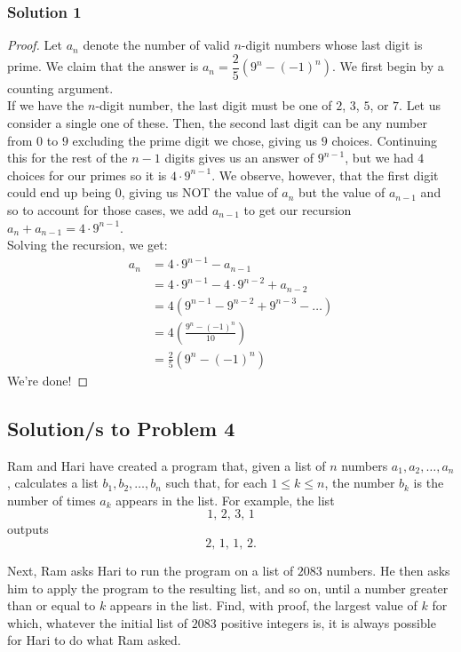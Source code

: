 \documentclass[11pt]{scrartcl}
\begin{document}
\subsubsection{Solution 1}

\begin{proof}
    Let $a_n$ denote the number of valid $n$-digit numbers whose last digit
    is prime. We claim that the answer is $a_n = \dfrac 25 (9^n-(-1)^n)$.
    We first begin by a counting argument. \\

    If we have the $n$-digit number, the last digit must be one of $2$, 
    $3$, $5$, or $7$. Let us consider a single one of these. Then, the 
    second last digit can be any number from $0$ to $9$ excluding the 
    prime digit we chose, giving us $9$ choices. Continuing this for the
    rest of the $n-1$ digits gives us an answer of $9^{n-1}$, but we had 
    $4$ choices for our primes so it is $4 \cdot 9^{n-1}$. We observe, however, 
    that the first digit could end up being $0$, giving us NOT the value of $a_n$
    but the value of $a_{n-1}$ and so to account for those cases, we add $a_{n-1}$ 
    to get our recursion $a_n + a_{n-1} = 4 \cdot 9^{n-1}$. \\

    Solving the recursion, we get:
    \begin{align*}
        a_n
        &= 4 \cdot 9^{n-1} - a_{n-1} \\
        &= 4 \cdot 9^{n-1} - 4 \cdot 9^{n-2} + a_{n-2} \\
        &= 4(9^{n-1} - 9^{n-2} + 9^{n-3} - \dots) \\
        &= 4 \left( \frac{9^n-(-1)^n}{10} \right) \\
        &= \frac25 (9^n-(-1)^n)
    \end{align*}
    We're done!
\end{proof}

\newpage

\subsection{Solution/s to Problem 4}

\begin{problem}
    Ram and Hari have created a program that,
    given a list of $n$ numbers
    $a_1, a_2, \dots, a_n$,
    calculates a list
    $b_1, b_2, \dots, b_n$
    such that, for each $1 \le k \le n$, the number $b_k$ is the number of
    times $a_k$ appears in the list. For example, the list
    \[
    1, \,2, \,3, \,1
    \]
    outputs
    \[
    2,\,1,\,1,\,2.
    \]

    Next, Ram asks Hari to run the program on a list of $2083$ numbers. He then
    asks him to apply the program to the resulting list, and so on, until a
    number greater than or equal to $k$ appears in the list. Find, with proof,
    the largest value of $k$ for which, whatever the initial list of $2083$
    positive integers is, it is always possible for Hari to do what Ram asked.
\end{problem}
\end{document}
